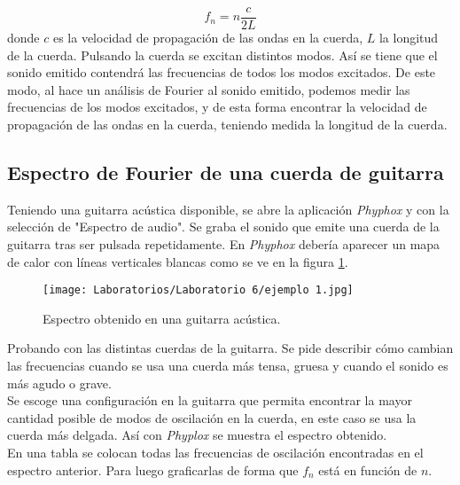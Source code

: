 \documentclass[letterpaper,11pt]{article} %
\begin{document}
$$f_n=n\frac{c}{2L}$$
donde $c$ es la velocidad de propagación de las ondas en la cuerda, $L$ la longitud de la cuerda. Pulsando la cuerda se excitan distintos modos. Así se tiene que el sonido emitido contendrá las frecuencias de todos los modos excitados. De este modo, al hace un análisis de Fourier al sonido emitido, podemos medir las frecuencias de los modos excitados, y de esta forma encontrar la velocidad de propagación de las ondas en la cuerda, teniendo medida la longitud de la cuerda.

\subsection{Espectro de Fourier de una cuerda de 
guitarra}
Teniendo una guitarra acústica disponible, se abre la aplicación \textit{Phyphox} y con la selección de "Espectro de audio". Se graba el sonido que emite una cuerda de la guitarra tras ser pulsada repetidamente. En \textit{Phyphox} debería aparecer un mapa de calor con líneas verticales blancas como se ve en la figura \ref{Ejemplo lineas blancas en mapa de color}.

\begin{figure}
    \centering
    \texttt{[image: Laboratorios/Laboratorio 6/ejemplo 1.jpg]}
    \caption{Espectro obtenido en una guitarra acústica.}
    \label{Ejemplo lineas blancas en mapa de color}
\end{figure}

Probando con las distintas cuerdas de la guitarra. Se pide describir cómo cambian las frecuencias cuando se usa una cuerda más tensa, gruesa y cuando el sonido es más agudo o grave.\\

Se escoge una configuración en la guitarra que permita encontrar la mayor cantidad posible de modos de oscilación en la cuerda, en este caso se usa la cuerda más delgada. Así con \textit{Phyplox} se muestra el espectro obtenido.\\

En una tabla se colocan todas las frecuencias de oscilación encontradas en el espectro anterior. Para luego graficarlas de forma que $f_n$ está en función de $n$.\\
\end{document}
